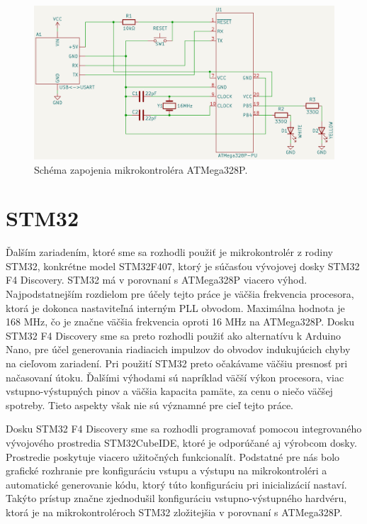 \begin{figure}
    \centerline{\includegraphics[width=1\textwidth]{images/schemeATMega.png}}
    \caption[Schéma zapojenia mikrokontroléra ATMega328P]{Schéma zapojenia mikrokontroléra ATMega328P.}
    \label{obr:schemeATMega}
\end{figure}

\section{STM32}
Ďalším zariadením, ktoré sme sa rozhodli použiť je mikrokontrolér z rodiny STM32, konkrétne model STM32F407, ktorý je súčasťou vývojovej dosky STM32 F4 Discovery. STM32 má v porovnaní s ATMega328P viacero výhod. Najpodstatnejším rozdielom pre účely tejto práce je väčšia frekvencia procesora, ktorá je dokonca nastaviteľná interným PLL obvodom. Maximálna hodnota je 168 MHz, čo je značne väčšia frekvencia oproti 16 MHz na ATMega328P. Dosku STM32 F4 Discovery sme sa preto rozhodli použiť ako alternatívu k Arduino Nano, pre účel generovania riadiacich impulzov do obvodov indukujúcich chyby na cieľovom zariadení. Pri použití STM32 preto očakávame väčšiu presnosť pri načasovaní útoku. Ďalšími výhodami sú napríklad väčší výkon procesora, viac vstupno-výstupných pinov a väčšia kapacita pamäte, za cenu o niečo väčšej spotreby. Tieto aspekty však nie sú významné pre cieľ tejto práce.

Dosku STM32 F4 Discovery sme sa rozhodli programovať pomocou integrovaného vývojového prostredia STM32CubeIDE, ktoré je odporúčané aj výrobcom dosky. Prostredie poskytuje viacero užitočných funkcionalít. Podstatné pre nás bolo grafické rozhranie pre konfiguráciu vstupu a výstupu na mikrokontroléri a automatické generovanie kódu, ktorý túto konfiguráciu pri inicializácií nastaví. Takýto prístup značne zjednodušil konfiguráciu vstupno-výstupného hardvéru, ktorá je na mikrokontroléroch STM32 zložitejšia v porovnaní s ATMega328P.

